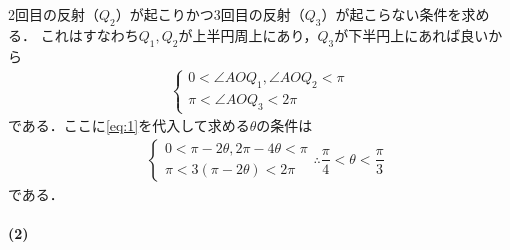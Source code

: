 \documentclass[../../main.tex]{subfiles}
\begin{document}
2回目の反射（$Q_2$）が起こりかつ3回目の反射（$Q_3$）が起こらない条件を求める．
これはすなわち$Q_1,Q_2$が上半円周上にあり，$Q_3$が下半円上にあれば良いから
\begin{align}
  \begin{cases}
    0 < \angle AOQ_1, \angle AOQ_2 < \pi \\
    \pi < \angle AOQ_3 < 2\pi
  \end{cases}
\end{align}
である．ここに\cref{eq:1}を代入して求める$\theta$の条件は
\begin{align}
  &
  \begin{cases}
    0 < \pi-2\theta, 2\pi-4\theta < \pi \\
    \pi < 3(\pi-2\theta) < 2\pi
  \end{cases}
  \therefore
  \dfrac{\pi}{4} < \theta < \dfrac{\pi}{3} \label{eq:2}
\end{align}
である．

\paragraph{(2)}
\end{document}
